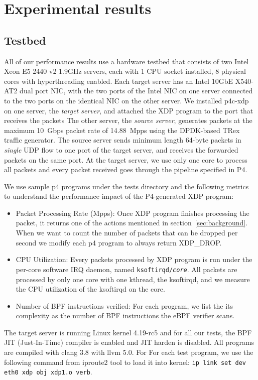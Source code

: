 \section{Experimental results}\label{sec:results}
\subsection{Testbed}
All of our performance results use a hardware testbed that consists of
two Intel Xeon E5 2440 v2 1.9GHz servers, each with 1 CPU socket installed,
8 physical cores with hyperthreading enabled.
Each target server has an Intel 10GbE X540-AT2 dual
port NIC, with the two ports of the Intel NIC on one server connected
to the two ports on the identical NIC on the other server.
We installed p4c-xdp on one server, the {\em target server}, and
attached the XDP program to the port that receives the packets
The other server, the {\em source server}, generates packets
at the maximum 10~Gbps packet rate of 14.88~Mpps using the DPDK-based
TRex~\cite{trex} traffic generator.  The source server sends minimum
length 64-byte packets in {\em single} UDP flow to one port of the
target server, and receives the forwarded packets on the same port.
At the target server, we use only one core to process all packets and
every packet received goes through the pipeline specified in P4.

We use sample p4 programs under the tests directory and the following
metrics to understand the performance impact of the P4-generated XDP
program:
\begin{itemize}
\item Packet Processing Rate (Mpps): Once XDP program finishes
  processing the packet, it returns one of the actions mentioned in
  section~\ref{sec:background}.  When we want to count the number of
  packets that can be dropped per second we modify each p4 program to
  always return XDP\_DROP.
\item CPU Utilization: Every packets processed by XDP program is run
  under the per-core software IRQ daemon, named
  \texttt{ksoftirqd/\textit{core}}.  All packets are processed by only
  one core with one kthread, the ksoftirqd, and we measure the CPU
  utilization of the ksoftirqd on the core.
\item Number of BPF instructions verified: For each program, we list
  the its complexity as the number of BPF instructions the eBPF
  verifier scans.
\end{itemize}

The target server is running Linux kernel 4.19-rc5 and for all our
tests, the BPF JIT (Just-In-Time) compiler is enabled and JIT harden
is disabled. All programs are compiled with clang 3.8 with llvm 5.0.
For For each test program, we use the following
command from iproute2 tool to load it into kernel:
\texttt{ip link set dev eth0 xdp obj xdp1.o verb}.


